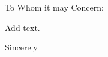 \documentclass[letterpaper,10pt]{letter}
\begin{document}

\begin{letter}{}

\address{2515 13th St NW\\
         Apt. 510\\
         Washington, DC 20009}

\opening{To Whom it may Concern:}

Add text.

\signature{Joshua Ryan Smith}

\closing{Sincerely}


\end{letter}
\end{document}
